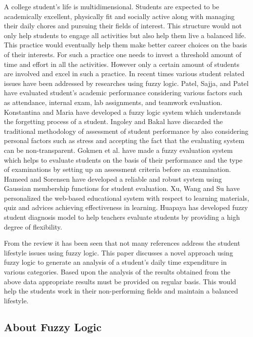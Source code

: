 \documentclass[conference]{IEEEtran}
\begin{document}
A college student\rq s life is multidimensional. Students are expected to be academically excellent, physically fit and socially active along with managing their daily chores and pursuing their fields of interest. This structure would not only help students to engage all activities but also help them live a balanced life. This practice would eventually help them make better career choices on the basis of their interests. For such a practice one needs to invest a threshold amount of time and effort in all the activities. However only a certain amount of students are involved and excel in such a practice. In recent times various student related issues have been addressed by researches using fuzzy logic. Patel, Sajja, and Patel \cite{Patel} have evaluated student\rq s academic performance considering various factors such as attendance, internal exam, lab assignments, and teamwork evaluation. Konstantina and Maria \cite{IEEEhowto:Chrysa} have developed a fuzzy logic system which understands the forgetting process of a student. Ingoley and Bakal \cite{IEEEhowto:ingoley} have discarded the traditional methodology of assessment of student performance by also considering personal factors such as stress and accepting the fact that the evaluating system can be non-transparent. Gokmen et al. \cite{IEEEhowto:Gokmen} have made a fuzzy evaluation system which helps to evaluate students on the basis of their performance and the type of examinations by setting up an assessment criteria before an examination. Hameed and Sorensen \cite{hameed} have developed a reliable and robust system using Gaussian membership functions for student evaluation. Xu, Wang and Su \cite{Wang} have personalized the web-based educational system with respect to learning materials, quiz and advices achieving effectiveness in learning. Huapaya \cite{IEEEhowto:Huapaya} has developed fuzzy student diagnosis model to help teachers evaluate students by providing a high degree of flexibility.

From the review it has been seen that not many references address the student lifestyle issues using fuzzy logic. This paper discusses a novel approach using fuzzy logic to generate an analysis of a student\rq s daily time expenditure in various categories. Based upon the analysis of the results obtained from the above data appropriate results must be provided on regular basis. This would help the students work in their non-performing fields and maintain a balanced lifestyle.

\subsection{About Fuzzy Logic}
\end{document}
